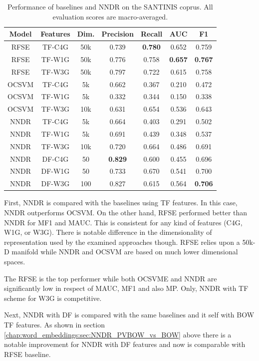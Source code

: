 {\begin{table}[t]
\center
\caption {Performance of baselines and NNDR on the SANTINIS coprus. All evaluation scores are macro-averaged.}
\label{chap:word_embeddings:tbl:NNDR_RFSE_OCSVME_final}
\begin{tabular}{ccccccc}
\hline
Model & Features & Dim. & Precision & Recall & AUC & F1 \\
\hline
RFSE & TF-C4G & 50k & 0.739 & \textbf{0.780} & 0.652 & 0.759 \\
RFSE & TF-W1G & 50k & 0.776 & 0.758 & \textbf{0.657} & \textbf{0.767} \\
RFSE & TF-W3G & 50k & 0.797 & 0.722 & 0.615 & 0.758 \\
OCSVM & TF-C4G & 5k & 0.662 & 0.367 & 0.210 & 0.472\\
OCSVM & TF-W1G & 5k & 0.332 & 0.344 & 0.150 & 0.338\\
OCSVM & TF-W3G & 10k & 0.631 & 0.654 & 0.536 & 0.643\\
NNDR & TF-C4G & 5k & 0.664 & 0.403 & 0.291 & 0.502 \\
NNDR & TF-W1G & 5k & 0.691 & 0.439 & 0.348 & 0.537 \\
NNDR & TF-W3G & 10k & 0.720 & 0.664 & 0.486 & 0.691 \\
NNDR & DF-C4G & 50 & \textbf{0.829} & 0.600 & 0.455 & 0.696 \\
NNDR & DF-W1G & 50 & 0.733 & 0.670 & 0.541 & 0.700 \\
NNDR & DF-W3G & 100 & 0.827 & 0.615 & 0.564 & \textbf{0.706} \\
\hline
\end{tabular}
\end{table}

First, NNDR is compared with the baselines using TF features. In this case, NNDR outperforms OCSVM. On the other hand, RFSE performed better than NNDR for MF1 and MAUC. This is consistent for any kind of features (C4G, W1G, or W3G). There is notable difference in the dimensionality of representation used by the examined approaches though. RFSE relies upon a 50k-D manifold while NNDR and OCSVM are based on much lower dimensional spaces. 

The RFSE is the top performer while both OCSVME and NNDR are significantly low in respect of MAUC, MF1 and also MP.  Only, NNDR with TF scheme for W3G is competitive.

Next, NNDR with DF is compared with the same baselines and it self with BOW TF features. As shown in section \ref{chap:word_embeddings:sec:NNDR_PVBOW_vs_BOW} above there is a notable improvement for NNDR with DF features and now is comparable with RFSE baseline. 

}
